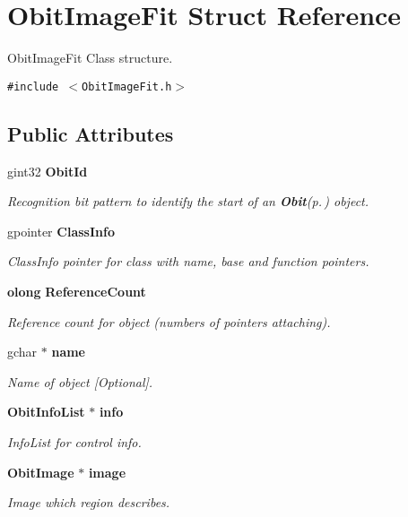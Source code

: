 \section{Obit\-Image\-Fit Struct Reference}
\label{structObitImageFit}
Obit\-Image\-Fit Class structure.  


{\tt \#include $<$Obit\-Image\-Fit.h$>$}

\subsection*{Public Attributes}
\begin{CompactItemize}
\item 
gint32 {\bf Obit\-Id}
\begin{CompactList}\small\item\em Recognition bit pattern to identify the start of an {\bf Obit}{\rm (p.\,\pageref{structObit})} object. \item\end{CompactList}\item 
gpointer {\bf Class\-Info}
\begin{CompactList}\small\item\em Class\-Info pointer for class with name, base and function pointers. \item\end{CompactList}\item 
{\bf olong} {\bf Reference\-Count}
\begin{CompactList}\small\item\em Reference count for object (numbers of pointers attaching). \item\end{CompactList}\item 
gchar $\ast$ {\bf name}
\begin{CompactList}\small\item\em Name of object [Optional]. \item\end{CompactList}\item 
{\bf Obit\-Info\-List} $\ast$ {\bf info}
\begin{CompactList}\small\item\em Info\-List for control info. \item\end{CompactList}\item 
{\bf Obit\-Image} $\ast$ {\bf image}
\begin{CompactList}\small\item\em Image which region describes. \item\end{CompactList}\item 

\end{CompactItemize}

